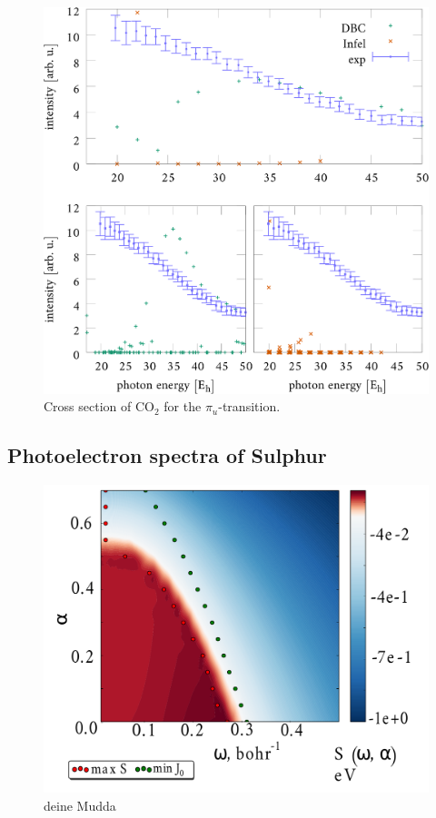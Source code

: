 \begin{figure}
\includegraphics[width=\textwidth]{Figures/CO2/pi_uCS.pdf}
\caption{Cross section of CO$_2$ for the $\pi_u$-transition.}
\label{fig:piuCS}
\end{figure}

\subsection{Photoelectron spectra of Sulphur}
\begin{figure}
   \includegraphics[width=\textwidth]{Figures/Sulphur/S8_stab_ion_cut_all}
   \caption{deine Mudda}
   \label{fig:SulphurStab}
\end{figure}

